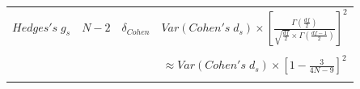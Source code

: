 \documentclass[
  english,
  man,floatsintext]{apa6}
\begin{document}
\begin{landscape}
\begin{longtable}[]{@{}lccc@{}}
\begin{minipage}[t]{0.12\columnwidth}\raggedright
\(Hedges's \; g_s\)\strut
\end{minipage} & \begin{minipage}[t]{0.11\columnwidth}\centering
\(N-2\)\strut
\end{minipage} & \begin{minipage}[t]{0.24\columnwidth}\centering
\(\delta_{Cohen}\)\strut
\end{minipage} & \begin{minipage}[t]{0.42\columnwidth}\centering
\(Var(Cohen's \; d_s) \times \left[ \frac{\Gamma(\frac{df}{2})}{\sqrt{\frac{df}{2}} \times \Gamma(\frac{df-1}{2})} \right]^2\)\strut
\end{minipage}\tabularnewline
\begin{minipage}[t]{0.12\columnwidth}\raggedright
\strut
\end{minipage} & \begin{minipage}[t]{0.11\columnwidth}\centering
\strut
\end{minipage} & \begin{minipage}[t]{0.24\columnwidth}\centering
\strut
\end{minipage} & \begin{minipage}[t]{0.42\columnwidth}\centering
\strut
\end{minipage}\tabularnewline
\begin{minipage}[t]{0.12\columnwidth}\raggedright
\strut
\end{minipage} & \begin{minipage}[t]{0.11\columnwidth}\centering
\strut
\end{minipage} & \begin{minipage}[t]{0.24\columnwidth}\centering
\strut
\end{minipage} & \begin{minipage}[t]{0.42\columnwidth}\centering
\(\approx Var(Cohen's \; d_s) \times \left[1-\frac{3}{4N-9}\right]^2\)\strut
\end{minipage}\tabularnewline
\begin{minipage}[t]{0.12\columnwidth}\raggedright
\strut
\end{minipage} & \begin{minipage}[t]{0.11\columnwidth}\centering
\strut
\end{minipage} & \begin{minipage}[t]{0.24\columnwidth}\centering
\strut
\end{minipage} & \begin{minipage}[t]{0.42\columnwidth}\centering
\strut
\end{minipage}\tabularnewline
\bottomrule
\end{longtable}


\end{landscape}
\end{document}
